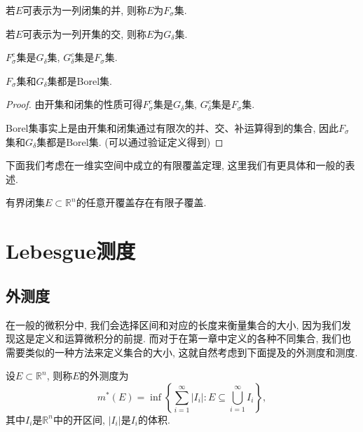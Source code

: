 \documentclass[theorem=false,mathfont=none,openany,sub3section]{easybook}
\newcommand{\btocgroup}[1][toc]{\addtocontents{#1}{\string\begingroup}}
\newcommand{\etocgroup}[1][toc]{\addtocontents{#1}{\string\endgroup}}
\begin{document}
\begin{definition}
  若$E$可表示为一列闭集的并, 则称$E$为$F_{\sigma}$集.\par
  若$E$可表示为一列开集的交, 则称$E$为$G_{\delta}$集.\par
\end{definition}

\begin{corollary}
  $F_{\sigma}^c$集是$G_{\delta}$集, $G_{\delta}^c$集是$F_{\sigma}$集.\par
  $F_{\sigma}$集和$G_{\delta}$集都是Borel集.\par
\end{corollary}

\begin{proof}
  由开集和闭集的性质可得$F_{\sigma}^c$集是$G_{\delta}$集, $G_{\delta}^c$集是$F_{\sigma}$集.\par
  Borel集事实上是由开集和闭集通过有限次的并、交、补运算得到的集合, 因此$F_{\sigma}$集和$G_{\delta}$集都是Borel集. (可以通过验证定义得到)\par
\end{proof}

下面我们考虑在一维实空间中成立的有限覆盖定理, 这里我们有更具体和一般的表述.\par

\begin{theorem}
  有界闭集$E\subset \mathbb{R}^n$的任意开覆盖存在有限子覆盖.\par
\end{theorem}

\newpage




\btocgroup
{}
\chapter{Lebesgue测度}

\etocgroup

\section{外测度}

在一般的微积分中, 我们会选择区间和对应的长度来衡量集合的大小, 因为我们发现这是定义和运算微积分的前提. 而对于在第一章中定义的各种不同集合, 我们也需要类似的一种方法来定义集合的大小, 这就自然考虑到下面提及的外测度和测度.\par

\begin{definition}
  设$E\subset \mathbb{R}^n$, 则称$E$的外测度为
  \begin{equation*}
    m^{*}(E)=\inf\left\{\sum_{i=1}^{\infty}|I_i|: E\subseteq \bigcup_{i=1}^{\infty}I_i\right\},
  \end{equation*}
  其中$I_i$是$\mathbb{R}^n$中的开区间, $|I_i|$是$I_i$的体积.\par
\end{definition}
\end{document}
